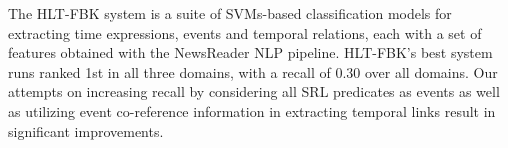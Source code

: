 The HLT-FBK system is a suite of SVMs-based classification models for extracting time expressions, events and temporal relations, each with a set of features obtained with the NewsReader NLP pipeline. HLT-FBK's best system runs ranked 1st in all three domains, with a recall of 0.30 over all domains. Our attempts on increasing recall by considering all SRL predicates as events as well as utilizing event co-reference information in extracting temporal links result in significant improvements.
